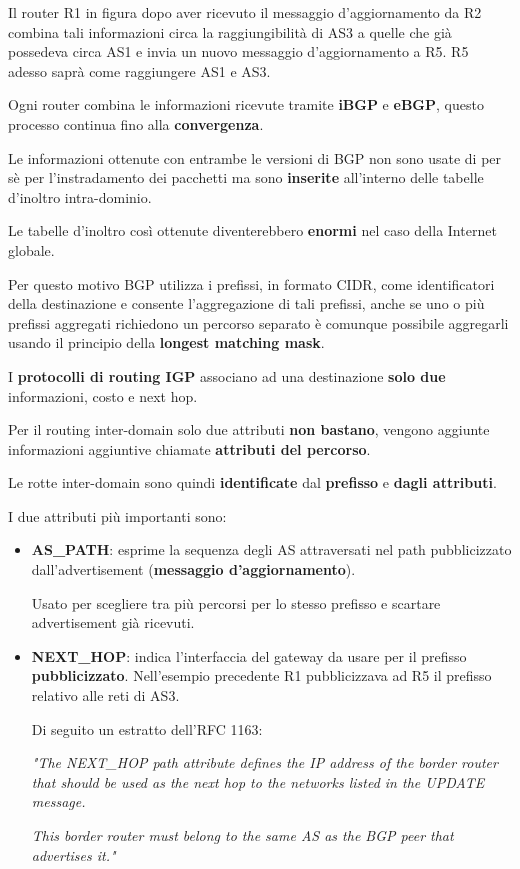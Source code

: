 \documentclass[11pt,a4paper,oneside]{book}
\theoremstyle{definition}
\begin{document}
Il router R1 in figura dopo aver ricevuto il messaggio d'aggiornamento da R2 combina tali informazioni circa la raggiungibilità di AS3 a quelle che già possedeva circa AS1 e invia un nuovo messaggio d'aggiornamento a R5. R5 adesso saprà come raggiungere AS1 e AS3.

Ogni router combina le informazioni ricevute tramite \textbf{iBGP} e \textbf{eBGP}, questo processo continua fino alla \textbf{convergenza}.

Le informazioni ottenute con entrambe le versioni di BGP non sono usate di per sè per l'instradamento dei pacchetti ma sono \textbf{inserite} all'interno delle tabelle d'inoltro intra-dominio.

\pagebreak

Le tabelle d'inoltro così ottenute diventerebbero \textbf{enormi} nel caso della Internet globale.

Per questo motivo BGP utilizza i prefissi, in formato CIDR, come identificatori della destinazione e consente l'aggregazione di tali prefissi, anche se uno o più prefissi aggregati richiedono un percorso separato è comunque possibile aggregarli usando il principio della \textbf{longest matching mask}.

I \textbf{protocolli di routing IGP} associano ad una destinazione \textbf{solo due} informazioni, costo e next hop.

Per il routing inter-domain solo due attributi \textbf{non bastano}, vengono aggiunte informazioni aggiuntive chiamate \textbf{attributi del percorso}.

Le rotte inter-domain sono quindi \textbf{identificate} dal \textbf{prefisso} e \textbf{dagli attributi}.

I due attributi più importanti sono:

\begin{itemize}
	\item \textbf{AS\_PATH}: esprime la sequenza degli AS attraversati nel path pubblicizzato
	      dall’advertisement (\textbf{messaggio d'aggiornamento}).

	      Usato per scegliere tra più percorsi per lo stesso prefisso e scartare advertisement già ricevuti.

	\item \textbf{NEXT\_HOP}: indica l’interfaccia del gateway da usare per il prefisso
	      \textbf{pubblicizzato}. Nell'esempio precedente R1 pubblicizzava ad R5 il prefisso relativo alle reti di AS3.

	      Di seguito un estratto dell'RFC 1163:

	      \textit{"The NEXT\_HOP path attribute defines the IP address of the border router that should be used as the next hop to the
		      networks listed in the UPDATE message.}

	      \textit{This border router must
		      belong to the same AS as the BGP peer that advertises it."}
\end{itemize}
\end{document}
